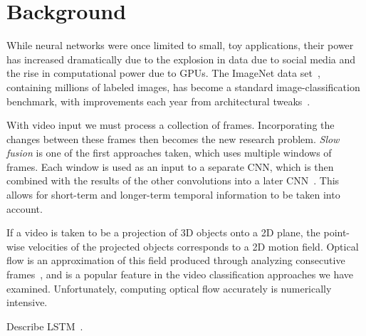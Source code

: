 \section{Background}
While neural networks were once limited to small, toy applications, 
their power has increased dramatically due to the explosion in data 
due to social media and the rise in computational power due to GPUs. 
The ImageNet data set~\cite{imagenet}, containing millions of labeled images, has become a standard image-classification benchmark, with improvements each year from architectural tweaks~\cite{alexnet,vggnet,nin,resnet}.

With video input we must process a collection of frames. Incorporating the changes between these frames then becomes the new research problem. \emph{Slow fusion} is one of the first approaches taken, which uses multiple windows of frames. Each window is used as an input to a separate CNN, which is then combined with the results of the other convolutions into a later CNN~\cite{cnnvid}. This allows for short-term and longer-term temporal information to be taken into account. 

If a video is taken to be a projection of 3D objects onto a 2D plane, the point-wise velocities of the projected objects corresponds to a 2D motion field. Optical flow is an approximation of this field produced through analyzing consecutive frames~\cite{brox}, and is a popular feature in the video classification approaches we have examined. Unfortunately, computing optical flow accurately is numerically intensive. 

Describe LSTM~\cite{lstm}.

